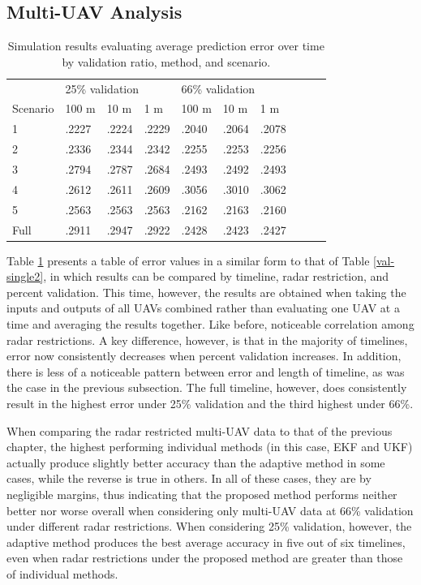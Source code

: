 \documentclass[12pt]{uthesis-v12}  %
\begin{document}
\subsection{Multi-UAV Analysis}
\label{multi-uav}

\begin{table}[!t]
\caption{Simulation results evaluating average prediction error over time by validation ratio, method, and scenario.}
\renewcommand{\arraystretch}{1.3}
\centering
{\begin{tabular}{*{10}{l}}
\toprule
& \multicolumn{3}{l}{25\% validation} & \multicolumn{3}{l}{66\% validation} \\
Scenario & 100 m & 10 m & 1 m & 100 m & 10 m & 1 m \\ \midrule
1 & .2227 & .2224 & .2229 & .2040 & .2064 & .2078 \\
2 & .2336 & .2344 & .2342 & .2255 & .2253 & .2256 \\
3 & .2794 & .2787 & .2684 & .2493 & .2492 & .2493 \\
4 & .2612 & .2611 & .2609 & .3056 & .3010 & .3062 \\
5 & .2563 & .2563 & .2563 & .2162 & .2163 & .2160 \\
Full & .2911 & .2947 & .2922 & .2428 & .2423 & .2427 \\ \bottomrule
\end{tabular}}

\label{val-multi2}
\end{table}

Table \ref{val-multi2} presents a table of error values in a similar form to that of Table \ref{val-single2}, in which results can be compared by timeline, radar restriction, and percent validation. This time, however, the results are obtained when taking the inputs and outputs of all UAVs combined rather than evaluating one UAV at a time and averaging the results together. Like before, noticeable correlation among radar restrictions. A key difference, however, is that in the majority of timelines, error now consistently decreases when percent validation increases. In addition, there is less of a noticeable pattern between error and length of timeline, as was the case in the previous subsection. The full timeline, however, does consistently result in the highest error under 25\% validation and the third highest under 66\%. 

When comparing the radar restricted multi-UAV data to that of the previous chapter, the highest performing individual methods (in this case, EKF and UKF) actually produce slightly better accuracy than the adaptive method in some cases, while the reverse is true in others. In all of these cases, they are by negligible margins, thus indicating that the proposed method performs neither better nor worse overall when considering only multi-UAV data at 66\% validation under different radar restrictions. When considering 25\% validation, however, the adaptive method produces the best average accuracy in five out of six timelines, even when radar restrictions under the proposed method are greater than those of individual methods.
\end{document}
